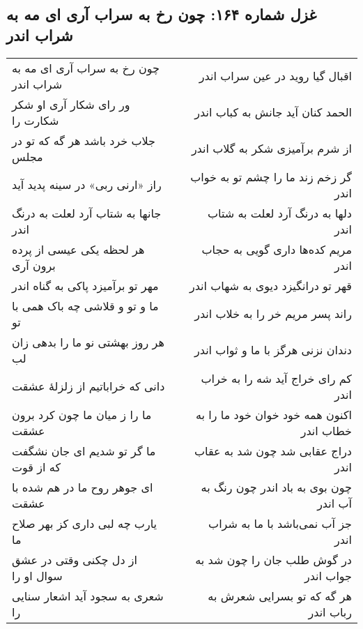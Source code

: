 \begin{center}
\section*{غزل شماره ۱۶۴: چون رخ به سراب آری ای مه به شراب اندر}
\label{sec:164}
\begin{longtable}{l p{0.5cm} r}
چون رخ به سراب آری ای مه به شراب اندر
&&
اقبال گیا روید در عین سراب اندر
\\
ور رای شکار آری او شکر شکارت را
&&
الحمد کنان آید جانش به کباب اندر
\\
جلاب خرد باشد هر گه که تو در مجلس
&&
از شرم برآمیزی شکر به گلاب اندر
\\
راز «ارنی ربی» در سینه پدید آید
&&
گر زخم زند ما را چشم تو به خواب اندر
\\
جانها به شتاب آرد لعلت به درنگ اندر
&&
دلها به درنگ آرد لعلت به شتاب اندر
\\
هر لحظه یکی عیسی از پرده برون آری
&&
مریم کده‌ها داری گویی به حجاب اندر
\\
مهر تو برآمیزد پاکی به گناه اندر
&&
قهر تو درانگیزد دیوی به شهاب اندر
\\
ما و تو و قلاشی چه باک همی با تو
&&
راند پسر مریم خر را به خلاب اندر
\\
هر روز بهشتی نو ما را بدهی زان لب
&&
دندان نزنی هرگز با ما و ثواب اندر
\\
دانی که خراباتیم از زلزلهٔ عشقت
&&
کم رای خراج آید شه را به خراب اندر
\\
ما را ز میان ما چون کرد برون عشقت
&&
اکنون همه خود خوان خود ما را به خطاب اندر
\\
ما گر تو شدیم ای جان نشگفت که از قوت
&&
دراج عقابی شد چون شد به عقاب اندر
\\
ای جوهر روح ما در هم شده با عشقت
&&
چون بوی به باد اندر چون رنگ به آب اندر
\\
یارب چه لبی داری کز بهر صلاح ما
&&
جز آب نمی‌باشد با ما به شراب اندر
\\
از دل چکنی وقتی در عشق سوال او را
&&
در گوش طلب جان را چون شد به جواب اندر
\\
شعری به سجود آید اشعار سنایی را
&&
هر گه که تو بسرایی شعرش به رباب اندر
\\
\end{longtable}
\end{center}
